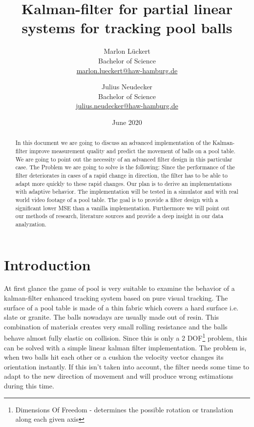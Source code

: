 \documentclass[titlepage, a4paper, 11pt]{scrartcl}
\begin{document}
    \title{Kalman-filter for partial linear systems for tracking pool balls}
    \author{Marlon Lückert \\ Bachelor of Science \\ \href{mailto:marlon.lueckert@haw-hamburg.de}{marlon.lueckert@haw-hamburg.de} 
    \and Julius Neudecker \\ Bachelor of Science \\ \href{mailto:julius.neudecker@haw-hamburg.de}{julius.neudecker@haw-hamburg.de} }
    \date{June 2020}
    \maketitle

    \tableofcontents

    \begin{abstract}
        In this document we are going to discuss an advanced implementation of the Kalman-filter \cite{kalman} improve measurement quality and predict the movement of balls on a pool table. 
        We are going to point out the necessity of an advanced filter design in this particular case. The Problem we are going to solve is the following:
        Since the performance of the filter deteriorates in cases of a rapid change in direction, the filter has to be able to adapt more quickly to these rapid changes.
        Our plan is to derive an implementations with adaptive behavior. The implementation will be tested in a simulator and with real world video footage of a pool table.
        The goal is to provide a filter design with a significant lower MSE than a vanilla implementation. Furthermore we will point out our methods of research, literature sources
        and provide a deep insight in our data analyzation.
    \end{abstract}


    \section{Introduction}
    At first glance the game of pool is very suitable to examine the behavior of a kalman-filter enhanced tracking system based on pure visual tracking. 
    The surface of a pool table is made of a thin fabric which covers a hard surface i.e. slate or granite.
    The balls nowadays are usually made out of resin. This combination of materials creates very small rolling resistance and the balls behave almost fully elastic on collision.
    Since this is only a 2 DOF\footnote{Dimensions Of Freedom - determines the possible rotation or translation along each given axis} problem, this can be solved with a simple linear kalman filter implementation. 
    The problem is, when two balls hit each other or a cushion the velocity vector changes its orientation instantly. 
    If this isn't taken into account, the filter needs some time to adapt to the new direction of movement and will produce wrong estimations during this time.
\end{document}

